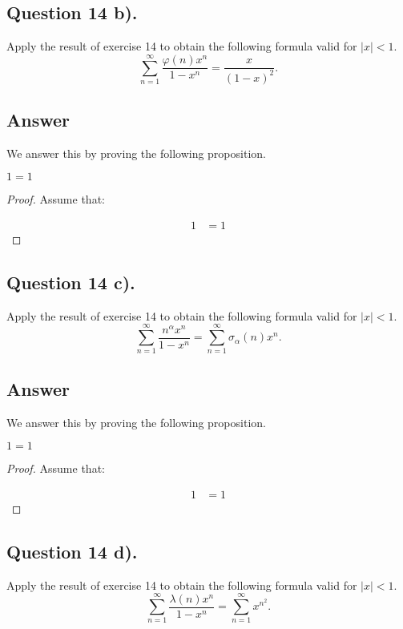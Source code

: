 \subsection{Question 14 b).}
\noindent
Apply the result of exercise 14 to obtain the following formula valid for $|x|<1$.
\[
    \sum_{n=1}^{\infty} \frac{\varphi(n) x^n}{1-x^n} = \frac{x}{(1-x)^2}.
\]

\subsection*{Answer}
\noindent
We answer this by proving the following proposition.

\begin{proposition}
    $1=1$
\end{proposition}

\begin{proof}
    Assume that:

    \begin{align*}
        1 &= 1
    \end{align*}

\end{proof}


\subsection{Question 14 c).}
\noindent
Apply the result of exercise 14 to obtain the following formula valid for $|x|<1$.
\[
    \sum_{n=1}^{\infty} \frac{n^\alpha x^n}{1-x^n} = \sum_{n=1}^{\infty} \sigma_{\alpha}(n)x^n.
\]

\subsection*{Answer}
\noindent
We answer this by proving the following proposition.

\begin{proposition}
    $1=1$
\end{proposition}

\begin{proof}
    Assume that:

    \begin{align*}
        1 &= 1
    \end{align*}

\end{proof}


\subsection{Question 14 d).}
\noindent
Apply the result of exercise 14 to obtain the following formula valid for $|x|<1$.
\[
    \sum_{n=1}^{\infty} \frac{\lambda(n) x^n}{1-x^n} = \sum_{n=1}^{\infty} x^{n^2}.
\]

